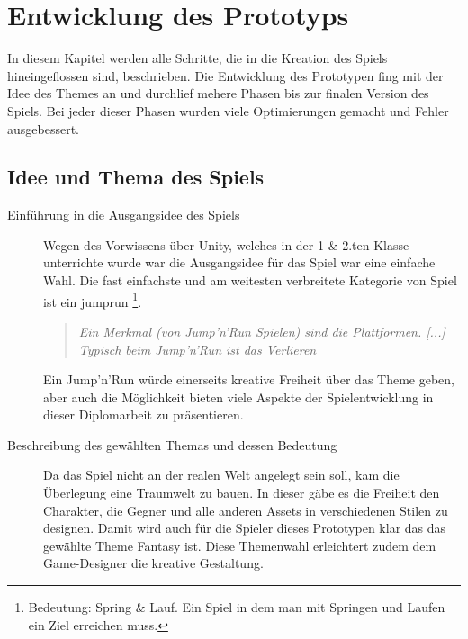 \pagebreak
\chapter{Entwicklung des Prototyps}

In diesem Kapitel werden alle Schritte, die in die Kreation des Spiels hineingeflossen sind, beschrieben. Die Entwicklung des Prototypen fing mit der Idee des Themes an und durchlief mehere Phasen bis zur finalen Version des Spiels. Bei jeder dieser Phasen wurden viele Optimierungen gemacht und Fehler ausgebessert. 


\section{Idee und Thema des Spiels}


\begin{description}
  \item [Einführung in die Ausgangsidee des Spiels]
    Wegen des Vorwissens über Unity, welches in der 1 \& 2.ten Klasse unterrichte wurde war die Ausgangsidee für das Spiel war eine einfache Wahl. Die fast einfachste und am weitesten verbreitete Kategorie von Spiel ist ein \gls{jumprun} \footnote[1]{Bedeutung: Spring \& Lauf. Ein Spiel in dem man mit Springen und Laufen ein Ziel erreichen muss.}. 

    \begin{quote}
      \emph{\glqq Ein Merkmal (von Jump'n'Run Spielen) sind die Plattformen. [...] Typisch beim Jump'n'Run ist das Verlieren\grqq}~\cite[1:42-1:57]{ArtOfGaming}
    \end{quote}
    
    Ein Jump'n'Run würde einerseits kreative Freiheit über das Theme geben, aber auch die Möglichkeit bieten viele Aspekte der Spielentwicklung in dieser Diplomarbeit zu präsentieren.

  \item [Beschreibung des gewählten Themas und dessen Bedeutung]
    Da das Spiel nicht an der realen Welt angelegt sein soll, kam die Überlegung eine Traumwelt zu bauen. In dieser gäbe es die Freiheit den Charakter, die Gegner und alle anderen Assets in verschiedenen Stilen zu designen. Damit wird auch für die Spieler dieses Prototypen klar das das gewählte Theme Fantasy ist. Diese Themenwahl erleichtert zudem dem Game-Designer die kreative Gestaltung.

  
\end{description}

